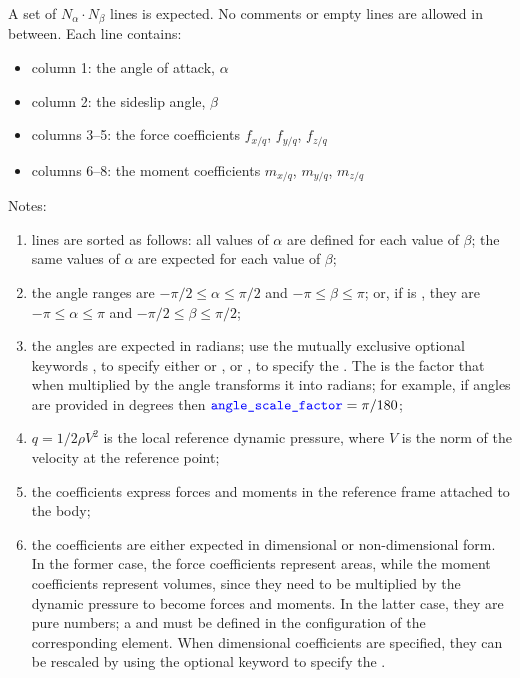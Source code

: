 A set of $N_\alpha \cdot N_\beta$ lines is expected.
No comments or empty lines are allowed in between.
Each line contains:
\begin{itemize}
\item column 1: the angle of attack, $\alpha$
\item column 2: the sideslip angle, $\beta$
\item columns 3--5: the force coefficients $f_{x/q}$, $f_{y/q}$, $f_{z/q}$
\item columns 6--8: the moment coefficients $m_{x/q}$, $m_{y/q}$, $m_{z/q}$
\end{itemize}

Notes:
\begin{enumerate}
\item lines are sorted as follows:
all values of $\alpha$ are defined for each value of $\beta$;
the same values of $\alpha$ are expected for each value of $\beta$;
\item the angle ranges are $-\pi/2 \le \alpha \le \pi/2$ and
$-\pi \le \beta \le \pi$; or, if  is ,
they are $-\pi \le \alpha \le \pi$ and $-\pi/2 \le \beta \le \pi/2$;
\item the angles are expected in radians;
use the mutually exclusive optional keywords ,
to specify either  or ,
or , to specify the .
The  is the factor that when multiplied by the
angle transforms it into radians; for example, if angles are provided
in degrees then $\textcolor{blue}{\texttt{angle\_scale\_factor}} = \pi/180$;
\item $q=1/2 \rho V^2$ is the local reference dynamic pressure,
where $V$ is the norm of the velocity at the reference point;
\item the coefficients express forces and moments in the reference frame
attached to the body;
\item the coefficients are either expected in dimensional
or non-dimensional form.
In the former case, the force coefficients represent areas,
while the moment coefficients represent volumes, since they need
to be multiplied by the dynamic pressure to become forces and moments.
In the latter case, they are pure numbers; a 
and  must be defined in the configuration
of the corresponding  element.
When dimensional coefficients are specified, they can be rescaled
by using the optional keyword  to specify
the .
\end{enumerate}

